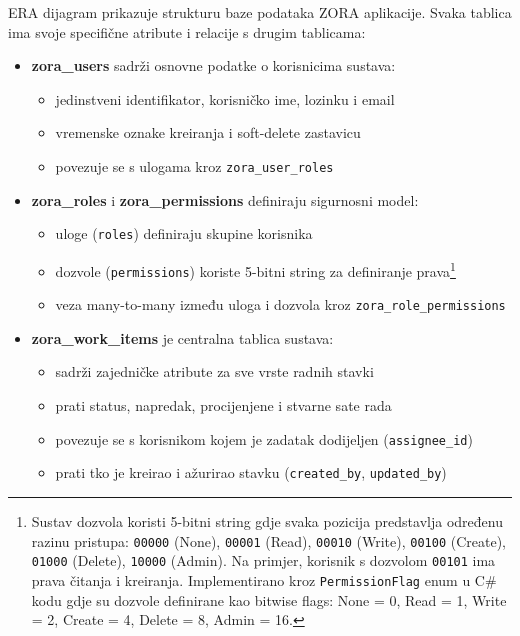 \documentclass[a4paper,12pt]{article}
\begin{document}
ERA dijagram prikazuje strukturu baze podataka ZORA aplikacije. Svaka tablica ima svoje specifične atribute i relacije s drugim tablicama:

\begin{itemize}
    \item \textbf{zora\_users} sadrži osnovne podatke o korisnicima sustava:
        \begin{itemize}
            \item jedinstveni identifikator, korisničko ime, lozinku i email
            \item vremenske oznake kreiranja i soft-delete zastavicu
            \item povezuje se s ulogama kroz \texttt{zora\_user\_roles}
        \end{itemize}
    
    \item \textbf{zora\_roles} i \textbf{zora\_permissions} definiraju sigurnosni model:
        \begin{itemize}
            \item uloge (\texttt{roles}) definiraju skupine korisnika
            \item dozvole (\texttt{permissions}) koriste 5-bitni string za definiranje prava\footnote{Sustav dozvola koristi 5-bitni string gdje svaka pozicija predstavlja određenu razinu pristupa: \texttt{00000} (None), \texttt{00001} (Read), \texttt{00010} (Write), \texttt{00100} (Create), \texttt{01000} (Delete), \texttt{10000} (Admin). Na primjer, korisnik s dozvolom \texttt{00101} ima prava čitanja i kreiranja. Implementirano kroz \texttt{PermissionFlag} enum u C\# kodu gdje su dozvole definirane kao bitwise flags: None = 0, Read = 1, Write = 2, Create = 4, Delete = 8, Admin = 16.}
            \item veza many-to-many između uloga i dozvola kroz \texttt{zora\_role\_permissions}
        \end{itemize}
    
    \item \textbf{zora\_work\_items} je centralna tablica sustava:
        \begin{itemize}
            \item sadrži zajedničke atribute za sve vrste radnih stavki
            \item prati status, napredak, procijenjene i stvarne sate rada
            \item povezuje se s korisnikom kojem je zadatak dodijeljen (\texttt{assignee\_id})
            \item prati tko je kreirao i ažurirao stavku (\texttt{created\_by}, \texttt{updated\_by})
        \end{itemize}
    

\end{itemize}
\end{document}
